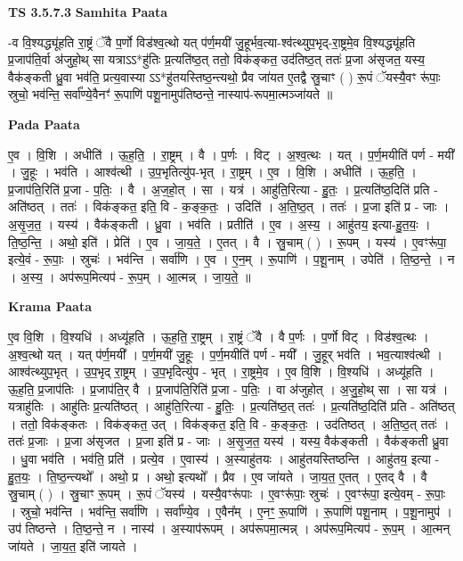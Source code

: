 \documentclass[17pt]{extarticle}
\begin{document}
\textbf{TS 3.5.7.3 } \newline
\textbf{Samhita Paata} \newline

-व वि॒श्यद्ध्यू॑हति रा॒ष्ट्रं ॅवै प॒र्णो विड॑श्व॒त्थो यत् प॑र्ण॒मयी॑ जु॒हूर्भव॒त्या-श्व॑त्थ्युप॒भृद्-रा॒ष्ट्रमे॒व वि॒श्यद्ध्यू॑हति प्र॒जाप॑ति॒र्वा अ॑जुहो॒थ् सा यत्राऽऽ*हु॑तिः प्र॒त्यति॑ष्ठ॒त् ततो॒ विक॑ङ्कत॒ उद॑तिष्ठ॒त् ततः॑ प्र॒जा अ॑सृजत॒ यस्य॒ वैक॑ङ्कती ध्रु॒वा भव॑ति॒ प्रत्य॒वास्या ऽऽ*हु॑तयस्तिष्ठ॒न्त्यथो॒ प्रैव जा॑यत ए॒तद्वै स्रु॒चाꣳ ( ) रू॒पं ॅयस्यै॒वꣳ रू॑पाः॒ स्रुचो॒ भव॑न्ति॒ सर्वा᳚ण्ये॒वैनꣳ॑ रू॒पाणि॑ पशू॒नामुप॑तिष्ठन्ते॒ नास्याप॑-रूपमा॒त्मञ्जा॑यते ॥ \newline

\textbf{Pada Paata} \newline

ए॒व । वि॒शि । अधीति॑ । ऊ॒ह॒ति॒ । रा॒ष्ट्रम् । वै । प॒र्णः । विट् । अ॒श्व॒त्थः । यत् । प॒र्ण॒मयीति॑ पर्ण - मयी᳚ । जु॒हूः । भव॑ति । आश्व॑त्थी । उ॒प॒भृतित्यु॑प-भृत् । रा॒ष्ट्रम् । ए॒व । वि॒शि । अधीति॑ । ऊ॒ह॒ति॒ । प्र॒जाप॑ति॒रिति॑ प्र॒जा - प॒तिः॒ । वै । अ॒ज॒हो॒त् । सा । यत्र॑ । आहु॑ति॒रित्या - हु॒तः॒ । प्र॒त्यति॑ष्ठ॒दिति॑ प्रति - अति॑ष्ठत् । ततः॑ । विक॑ङ्कत॒ इति॒ वि - क॒ङ्क॒तः॒ । उदिति॑ । अ॒ति॒ष्ठ॒त् । ततः॑ । प्र॒जा इति॑ प्र - जाः । अ॒सृ॒ज॒त॒ । यस्य॑ । वैक॑ङ्कती । ध्रु॒वा । भव॑ति । प्रतीति॑ । ए॒व । अ॒स्य॒ । आहु॑तय॒ इत्या-हु॒त॒यः॒ । ति॒ष्ठ॒न्ति॒ । अथो॒ इति॑ । प्रेति॑ । ए॒व । जा॒य॒ते॒ । ए॒तत् । वै । स्रु॒चाम् ( ) । रू॒पम् । यस्य॑ । ए॒वꣳरू॑पा॒ इत्ये॒वं - रू॒पाः॒ । स्रुचः॑ । भव॑न्ति । सर्वा॑णि । ए॒व । ए॒न॒म् । रू॒पाणि॑ । प॒शू॒नाम् । उपेति॑ । ति॒ष्ठ॒न्ते॒ । न । अ॒स्य॒ । अप॑रूप॒मित्यप॑ - रू॒प॒म् । आ॒त्मन्न् । जा॒य॒ते॒ ॥  \newline


\textbf{Krama Paata} \newline

ए॒व वि॒शि । वि॒श्यधि॑ । अध्यू॑हति । ऊ॒ह॒ति॒ रा॒ष्ट्रम् । रा॒ष्ट्रं ॅवै । वै प॒र्णः । प॒र्णो विट् । विड॑श्व॒त्थः । अ॒श्व॒त्थो यत् । यत् प॑र्ण॒मयी᳚ । प॒र्ण॒मयी॑ जु॒हूः । प॒र्ण॒मयीति॑ पर्ण - मयी᳚ । जु॒हूर् भव॑ति । भव॒त्याश्व॑त्थी । आश्व॑त्थ्युप॒भृत् । उ॒प॒भृद् रा॒ष्ट्रम् । उ॒प॒भृदित्यु॑प - भृत् । रा॒ष्ट्रमे॒व । ए॒व वि॒शि । वि॒श्यधि॑ । अध्यू॑हति । ऊ॒ह॒ति॒ प्र॒जाप॑तिः । प्र॒जाप॑ति॒र् वै । प्र॒जाप॑ति॒रिति॑ प्र॒जा - प॒तिः॒ । वा अ॑जुहोत् । अ॒जु॒हो॒थ् सा । सा यत्र॑ । यत्राहु॑तिः । आहु॑तिः प्र॒त्यति॑ष्ठत् । आहु॑ति॒रित्या - हु॒तिः॒ । प्र॒त्यति॑ष्ठ॒त् ततः॑ । प्र॒त्यति॑ष्ठ॒दिति॑ प्रति - अति॑ष्ठत् । ततो॒ विक॑ङ्कतः । विक॑ङ्कत॒ उत् । विक॑ङ्कत॒ इति॒ वि - क॒ङ्क॒तः॒ । उद॑तिष्ठत् । अ॒ति॒ष्ठ॒त् ततः॑ । ततः॑ प्र॒जाः । प्र॒जा अ॑सृजत । प्र॒जा इति॑ प्र - जाः । अ॒सृ॒ज॒त॒ यस्य॑ । यस्य॒ वैक॑ङ्कती । वैक॑ङ्कती ध्रु॒वा । धु॒वा भव॑ति । भव॑ति॒ प्रति॑ । प्रत्ये॒व । ए॒वास्य॑ । अ॒स्याहु॑तयः । आहु॑तयस्तिष्ठन्ति । आहु॑तय॒ इत्या - हु॒त॒यः॒ । ति॒ष्ठ॒न्त्यथो᳚ । अथो॒ प्र । अथो॒ इत्यथो᳚ । प्रैव । ए॒व जा॑यते । जा॒य॒त॒ ए॒तत् । ए॒तद् वै । वै स्रु॒चाम् ( ) । स्रु॒चाꣳ रू॒पम् । रू॒पं ॅयस्य॑ । यस्यै॒वꣳरू॑पाः । ए॒वꣳरू॑पाः॒ स्रुचः॑ । ए॒वꣳरू॑पा॒ इत्ये॒वम् - रू॒पाः॒ । स्रुचो॒ भव॑न्ति । भव॑न्ति॒ सर्वा॑णि । सर्वा᳚ण्ये॒व । ए॒वैन᳚म् । ए॒नꣳ॒॒ रू॒पाणि॑ । रू॒पाणि॑ पशू॒नाम् । प॒शू॒नामुप॑ । उप॑ तिष्ठन्ते । ति॒ष्ठ॒न्ते॒ न । नास्य॑ । अ॒स्याप॑रूपम् । अप॑रूपमा॒त्मन्न् । अप॑रूप॒मित्यप॑ - रू॒प॒म् । आ॒त्मन् जा॑यते । जा॒य॒त॒ इति॑ जायते । \newline
\end{document}
